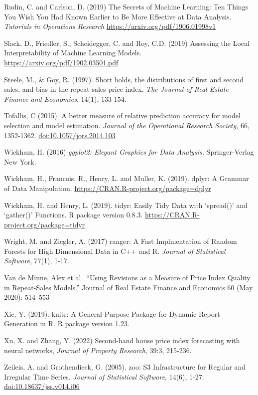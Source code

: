 \documentclass[
]{article}
\begin{document}
Rudin, C. and Carlson, D. (2019) The Secrets of Machine Learning: Ten
Things You Wish You Had Known Earlier to Be More Effective at Data
Analysis. \emph{Tutorials in Operations Research}
\url{https://arxiv.org/pdf/1906.01998v1}

Slack, D., Friedler, S., Scheidegger, C. and Roy, C.D. (2019) Assessing
the Local Interpretability of Machine Learning Models.
\url{https://arxiv.org/pdf/1902.03501.pdf}

Steele, M., \& Goy, R. (1997). Short holds, the distributions of first
and second sales, and bias in the repeat-sales price index. \emph{The
Journal of Real Estate Finance and Economics}, 14(1), 133-154.

Tofallis, C (2015). A better measure of relative prediction accuracy for
model selection and model estimation. \emph{Journal of the Operational
Research Society}, 66, 1352-1362. \url{doi:10.1057/jors.2014.103}

Wickham, H. (2016) \emph{ggplot2: Elegant Graphics for Data Analysis.}
Springer-Verlag New York.

Wickham, H., Francois, R., Henry, L. and Muller, K. (2019). dplyr: A
Grammar of Data Manipulation.
\url{https://CRAN.R-project.org/package=dplyr}

Wickham, H. and Henry, L. (2019). tidyr: Easily Tidy Data with
`spread()' and `gather()' Functions. R package version 0.8.3.
\url{https://CRAN.R-project.org/package=tidyr}

Wright, M. and Ziegler, A. (2017) ranger: A Fast Implmentation of Random
Forests for High Dimensional Data in C++ and R. \emph{Journal of
Statistical Software}, 77(1), 1-17.

Van de Minne, Alex et al.~``Using Revisions as a Measure of Price Index
Quality in Repeat-Sales Models.'' Journal of Real Estate Finance and
Economics 60 (May 2020): 514--553

Xie, Y. (2019). knitr: A General-Purpose Package for Dynamic Report
Generation in R. R package version 1.23.

Xu, X. and Zhang, Y. (2022) Second-hand house price index forecasting
with neural networks, \emph{Journal of Property Research}, 39:3,
215-236.

Zeileis, A. and Grothendieck, G. (2005). zoo: S3 Infrastructure for
Regular and Irregular Time Series. \emph{Journal of Statistical
Software}, 14(6), 1-27. \url{doi:10.18637/jss.v014.i06}
\end{document}
